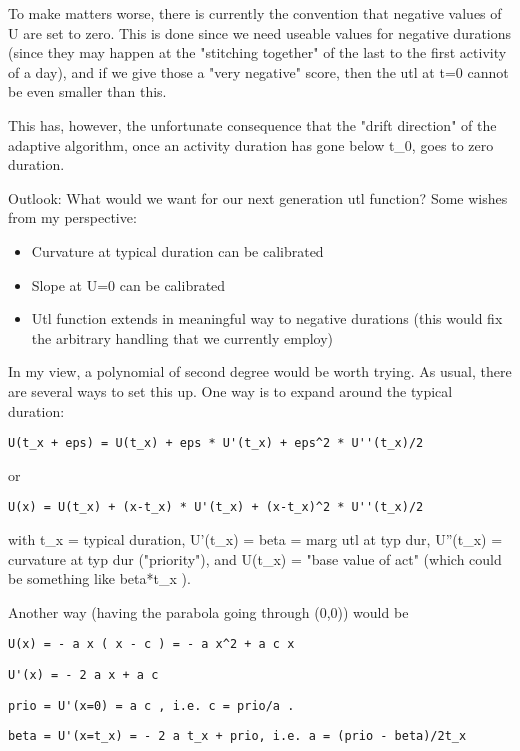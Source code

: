 \documentclass[a4paper,11pt]{report}
\begin{document}
To make matters worse, there is currently the  convention that  negative values of U are set to zero. This is done  since we need  useable values for negative durations (since they may  happen at the  "stitching together" of the last to the first activity of a  day), and  if we give those a "very negative" score, then the utl at t=0  cannot be  even smaller than this.

This has, however, the  unfortunate consequence that the "drift  direction" of the adaptive  algorithm, once an activity duration has  gone below t\_0, goes to zero  duration.



Outlook: What would we want for our next generation utl function? Some wishes from my perspective:
\begin{itemize}
	\item Curvature at typical duration can be calibrated
	\item Slope at U=0 can be calibrated
	\item Utl function extends in meaningful way to negative durations (this would fix the arbitrary handling that we currently employ)
\end{itemize}



In  my view, a polynomial of second degree would be worth trying. As  usual,  there are several ways to set this up. One way is to  expand around the  typical duration:
\begin{verbatim}
U(t_x + eps) = U(t_x) + eps * U'(t_x) + eps^2 * U''(t_x)/2
\end{verbatim}

or
\begin{verbatim}
U(x) = U(t_x) + (x-t_x) * U'(t_x) + (x-t_x)^2 * U''(t_x)/2
\end{verbatim}

with   t\_x = typical duration, U'(t\_x) = beta = marg utl at typ dur, U''(t\_x)  =  curvature at typ dur ("priority"), and U(t\_x) = "base value of act"   (which could be something like beta*t\_x ).



Another way (having the parabola going through (0,0)) would be
\begin{verbatim}
U(x) = - a x ( x - c ) = - a x^2 + a c x
\end{verbatim}
\begin{verbatim}
U'(x) = - 2 a x + a c
\end{verbatim}
\begin{verbatim}
prio = U'(x=0) = a c , i.e. c = prio/a .
\end{verbatim}
\begin{verbatim}
beta = U'(x=t_x) = - 2 a t_x + prio, i.e. a = (prio - beta)/2t_x
\end{verbatim}
\end{document}

